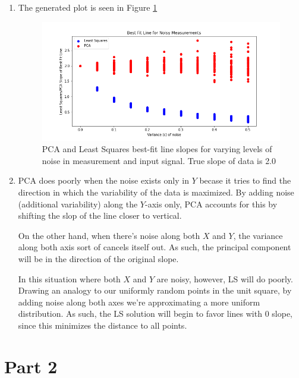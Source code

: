 \documentclass[12pt]{article}
\begin{document}
\begin{enumerate}[label=(\alph*)]
  \item
    The generated plot is seen in Figure \ref{fig:problem1d}
    \begin{figure}[!ht]
      \centering
      \includegraphics[scale=0.5]{figures/problem1d.png}
      \caption{PCA and Least Squares best-fit line slopes for varying levels of noise in measurement and input signal. True slope of data is 2.0}
      \label{fig:problem1d}
    \end{figure}

  \item
    PCA does poorly when the noise exists only in $Y$ becase it tries to find the direction in which the variability of the data is maximized. By adding noise (additional variability) along the $Y$-axis only, PCA accounts for this by shifting the slop of the line closer to vertical.

    On the other hand, when there's noise along both $X$ and $Y$, the variance along both axis sort of cancels itself out. As such, the principal component will be in the direction of the original slope.

    In this situation where both $X$ and $Y$ are noisy, however, LS will do poorly. Drawing an analogy to our uniformly random points in the unit square, by adding noise along both axes we're approximating a more uniform distribution. As such, the LS solution will begin to favor lines with 0 slope, since this minimizes the distance to all points.

\end{enumerate}

\newpage
\section*{Part 2}
\end{document}
